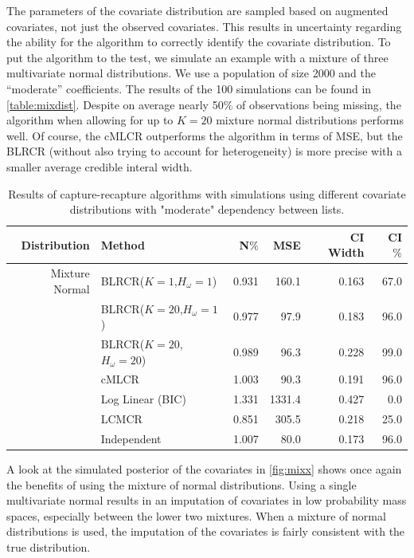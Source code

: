 \documentclass[
  12pt,
]{article}
\begin{document}
The parameters of the covariate distribution are sampled based on
augmented covariates, not just the observed covariates. This results in
uncertainty regarding the ability for the algorithm to correctly
identify the covariate distribution. To put the algorithm to the test,
we simulate an example with a mixture of three multivariate normal
distributions. We use a population of size 2000 and the ``moderate''
coefficients. The results of the 100 simulations can be found in
\autoref{table:mixdist}. Despite on average nearly 50\(\%\) of
observations being missing, the algorithm when allowing for up to
\(K=20\) mixture normal distributions performs well. Of course, the
cMLCR outperforms the algorithm in terms of MSE, but the BLRCR (without
also trying to account for heterogeneity) is more precise with a smaller
average credible interal width.

\singlespacing
\begin{table}[H]
\centering
\begin{tabular}{||r l r r r r||} 
 \hline
Distribution & Method & N$\%$ &MSE & CI Width & CI $\%$   \\ [0.5ex] 
 \hline\hline
 Mixture Normal& BLRCR($K=1$,$H_\omega=1$)  & 0.931   & 160.1   & 0.163   & 67.0 \\ 
               & BLRCR($K=20$,$H_\omega=1$)    & 0.977     & 97.9     & 0.183     & 96.0 \\ 
               & BLRCR($K=20$,$H_\omega=20$)    & 0.989     & 96.3     & 0.228     & 99.0 \\  
               & cMLCR       & 1.003       & 90.3      & 0.191      & 96.0 \\
               & Log Linear (BIC)  & 1.331      & 1331.4     & 0.427     & 0.0 \\ 
               & LCMCR       & 0.851       & 305.5      & 0.218      & 25.0 \\ 
               & Independent & 1.007 & 80.0& 0.173& 96.0 \\ 

 \hline
\end{tabular}
\caption{Results of capture-recapture algorithms with simulations using different covariate distributions with "moderate" dependency between lists.}
\label{table:mixdist}
\end{table}
\doublespacing

A look at the simulated posterior of the covariates in
\autoref{fig:mixx} shows once again the benefits of using the mixture of
normal distributions. Using a single multivariate normal results in an
imputation of covariates in low probability mass spaces, especially
between the lower two mixtures. When a mixture of normal distributions
is used, the imputation of the covariates is fairly consistent with the
true distribution.
\end{document}
